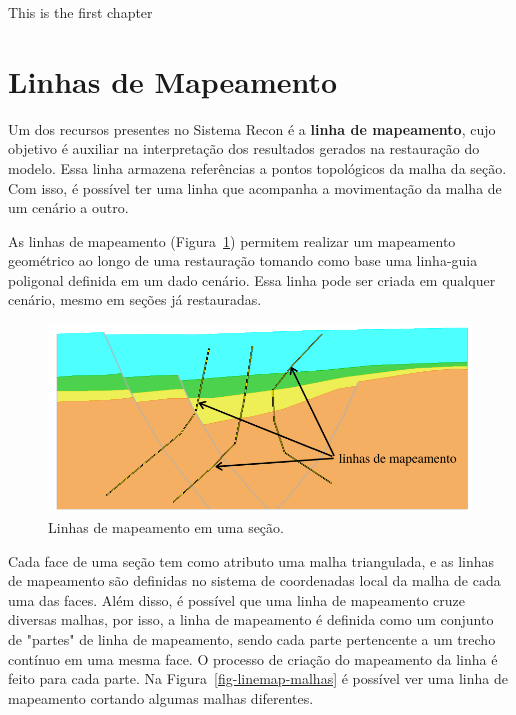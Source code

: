 This is the first chapter

\section{Linhas de Mapeamento}

Um dos recursos presentes no Sistema Recon é a \textbf{linha de mapeamento}, cujo objetivo é auxiliar na interpretação dos resultados gerados na restauração do modelo. Essa linha armazena referências a pontos topológicos da malha da seção. Com isso, é possível ter uma linha que acompanha a movimentação da malha de um cenário a outro.

As linhas de mapeamento (Figura~\ref{fig-linemap}) permitem realizar um mapeamento geométrico ao longo de uma restauração tomando como base uma linha-guia poligonal definida em um dado cenário. Essa linha pode ser criada em qualquer cenário, mesmo em seções já restauradas.

\begin{figure} [h]
  \begin{center}
    \includegraphics[width=400pt]{images/fig-linhas-de-mapeamento-ed}
    \caption{Linhas de mapeamento em uma seção.}\label{fig-linemap}
  \end{center}
\end{figure}

Cada face de uma seção tem como atributo uma malha triangulada, e as linhas de mapeamento são definidas no sistema de coordenadas local da malha de cada uma das faces. Além disso, é possível que uma linha de mapeamento cruze diversas malhas, por isso, a linha de mapeamento é definida como um conjunto de "partes" de linha de mapeamento, sendo cada parte pertencente a um trecho contínuo em uma mesma face. O processo de criação do mapeamento da linha é feito para cada parte. Na Figura~\ref{fig-linemap-malhas} é possível ver uma linha de mapeamento cortando algumas malhas diferentes.

